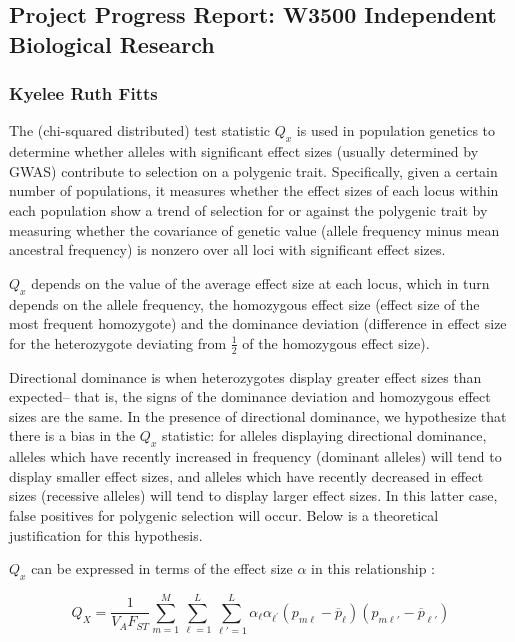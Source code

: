 \documentclass[a4paper,10pt]{article}
\begin{document}
\subsection*{Project Progress Report: W3500 Independent Biological Research}
\subsubsection*{Kyelee Ruth Fitts}

The (chi-squared distributed) test statistic $Q_x$ is used in population genetics to determine
whether alleles with significant effect sizes (usually determined by
GWAS) contribute to selection on a polygenic trait. Specifically,
given a certain number of populations, it measures whether the effect
sizes of each locus within each population show a trend of selection
for or against the polygenic trait by measuring whether the covariance
of genetic value (allele frequency minus mean ancestral frequency) is
nonzero over all loci with significant effect sizes.

$Q_x$ depends on the value of the average effect size at each
locus, which in turn depends on the allele frequency, the homozygous
effect size (effect size of the most frequent homozygote) and the
dominance deviation (difference in effect size for the heterozygote
deviating from $\frac{1}{2}$ of the homozygous effect size).

Directional dominance is when heterozygotes display greater
effect sizes than expected-- that is, the signs of
the dominance deviation and homozygous effect sizes are the same. In
the presence of directional dominance, we hypothesize that there is a
bias in the $Q_x$ statistic: for alleles displaying directional
dominance, alleles which have recently increased in frequency
(dominant alleles)  will tend to display smaller effect sizes, and alleles which have recently decreased in
effect sizes (recessive alleles) will tend to display larger effect
sizes. In this latter case, false positives for polygenic selection
will occur. Below is a theoretical justification for this hypothesis.

$Q_x$ can be
expressed in terms of the effect size $\alpha$ in this relationship \cite{gwasintro}:

\begin{equation} \label{eqn:Qxraw}
  Q_X = \frac{1}{V_A F_{ST}} \sum_{m=1}^M \sum_{\ell=1}^L \sum_{\ell\prime=1}^L \alpha_{\ell} \alpha_{\ell^{\prime}}\left(p_{m\ell} - \overline{p}_\ell \right)\left(p_{m \ell\prime} - \overline{p}_{\ell\prime}\right)
\end{equation}
\end{document}
